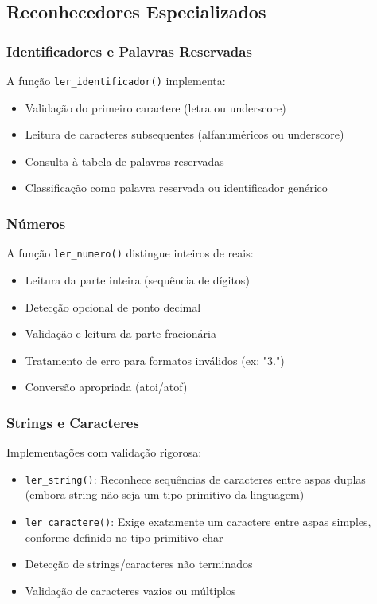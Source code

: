 \documentclass[12pt]{article}
\begin{document}
\subsection{Reconhecedores Especializados}

\subsubsection{Identificadores e Palavras Reservadas}
A função \texttt{ler\_identificador()} implementa:
\begin{itemize}[noitemsep]
    \item Validação do primeiro caractere (letra ou underscore)
    \item Leitura de caracteres subsequentes (alfanuméricos ou underscore)
    \item Consulta à tabela de palavras reservadas
    \item Classificação como palavra reservada ou identificador genérico
\end{itemize}

\subsubsection{Números}
A função \texttt{ler\_numero()} distingue inteiros de reais:
\begin{itemize}[noitemsep]
    \item Leitura da parte inteira (sequência de dígitos)
    \item Detecção opcional de ponto decimal
    \item Validação e leitura da parte fracionária
    \item Tratamento de erro para formatos inválidos (ex: "3.")
    \item Conversão apropriada (atoi/atof)
\end{itemize}

\subsubsection{Strings e Caracteres}
Implementações com validação rigorosa:
\begin{itemize}[noitemsep]
    \item \texttt{ler\_string()}: Reconhece sequências de caracteres entre aspas duplas (embora string não seja um tipo primitivo da linguagem)
    \item \texttt{ler\_caractere()}: Exige exatamente um caractere entre aspas simples, conforme definido no tipo primitivo char
    \item Detecção de strings/caracteres não terminados
    \item Validação de caracteres vazios ou múltiplos
\end{itemize}
\end{document}
